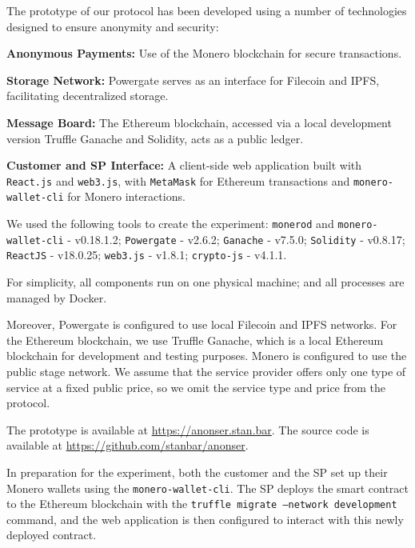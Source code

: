 \documentclass[pdftex,twocolumn,epjc3]{svjour3}
\begin{document}
The prototype of our protocol has been developed using a number of technologies designed to ensure anonymity and security:
\begin{itemize}
\begin{sloppypar}
  \item \textbf{Anonymous Payments:} Use of the Monero blockchain for secure transactions.
\end{sloppypar}
  \item \textbf{Storage Network:} Powergate serves as an interface for Filecoin and IPFS, facilitating decentralized storage.
  \item \textbf{Message Board:} The Ethereum blockchain, accessed via a local development version Truffle Ganache and Solidity, acts as a public ledger.
  \item \textbf{Customer and SP Interface:} A client-side web application built with \texttt{React.js} and \texttt{web3.js}, with \texttt{MetaMask} for Ethereum transactions and \texttt{monero-wallet-cli} for Monero interactions.
\end{itemize}

We used the following tools to create the experiment:
\texttt{monerod} and \texttt{monero-wallet-cli} - v0.18.1.2; \texttt{Powergate} - v2.6.2; \texttt{Ganache} - v7.5.0; \texttt{Solidity} - v0.8.17; \texttt{ReactJS} - v18.0.25; \texttt{web3.js} - v1.8.1; \texttt{crypto-js} - v4.1.1.

For simplicity, all components run on one physical machine; and all processes are managed by Docker. 

Moreover, Powergate is configured to use local Filecoin and IPFS networks.
For the Ethereum blockchain, we use Truffle Ganache, which is a local Ethereum blockchain for development and testing purposes. 
Monero is configured to use the public stage network.
We assume that the service provider offers only one type of service at a fixed public price, so we omit the service type and price from the protocol.

The prototype is available at \url{https://anonser.stan.bar}. The source code is available at \url{https://github.com/stanbar/anonser}.

\begin{sloppypar}
In preparation for the experiment, both the customer and the SP set up their Monero wallets using the \texttt{monero-wallet-cli}. The SP deploys the smart contract to the Ethereum blockchain with the \texttt{truffle migrate --network development} command, and the web application is then configured to interact with this newly deployed contract.
\end{sloppypar}
\end{document}
